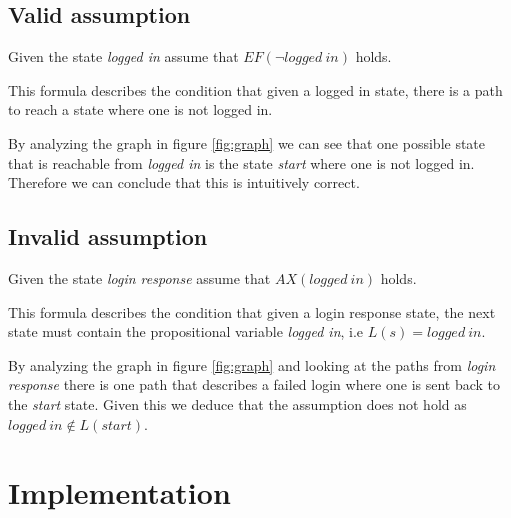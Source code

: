 \documentclass[a4paper,11pt]{article}
\begin{document}
\newpage
\subsection{Valid assumption}
Given the state \textit{logged in} assume that $EF(\neg logged \: in)$ holds.

This formula describes the condition that given a logged in state, there is a path
to reach a state where one is not logged in.

By analyzing the graph in figure \ref{fig:graph} we can see that one possible state that is reachable from
\textit{logged in} is the state \textit{start} where one is not logged in. Therefore we can conclude that this is intuitively correct.

\subsection{Invalid assumption}
Given the state \textit{login response} assume that $AX(logged \: in)$ holds.

This formula describes the condition that given a login response state, the next state must contain the propositional variable \textit{logged in}, i.e $L(s)=logged \: in$.

By analyzing the graph in figure \ref{fig:graph} and looking at the paths from \textit{login response} there is one path that describes a failed login where one is sent back to the \textit{start} state. Given this we deduce that the assumption does not hold as $logged \: in \notin L(start)$.

\section{Implementation}
\end{document}
